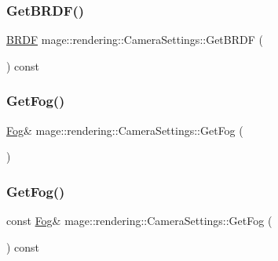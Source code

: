 \hypertarget{classmage_1_1rendering_1_1_camera_settings_a3cb398b3bd69ae3a81e2e4c415d9e195}{}\label{classmage_1_1rendering_1_1_camera_settings_a3cb398b3bd69ae3a81e2e4c415d9e195} 
\subsubsection{\texorpdfstring{Get\+B\+R\+D\+F()}{GetBRDF()}}
{\footnotesize\ttfamily \hyperlink{namespacemage_1_1rendering_ab8fe8684ca4bd74ba3a394b00cf125b5}{B\+R\+DF} mage\+::rendering\+::\+Camera\+Settings\+::\+Get\+B\+R\+DF (\begin{DoxyParamCaption}{ }\end{DoxyParamCaption}) const\hspace{0.3cm}{\ttfamily [noexcept]}}

\hypertarget{classmage_1_1rendering_1_1_camera_settings_a47b2b9eeca9d9eec61a7e290e1abfa43}{}\label{classmage_1_1rendering_1_1_camera_settings_a47b2b9eeca9d9eec61a7e290e1abfa43} 
\subsubsection{\texorpdfstring{Get\+Fog()}{GetFog()}\hspace{0.1cm}{\footnotesize\ttfamily [1/2]}}
{\footnotesize\ttfamily \hyperlink{classmage_1_1rendering_1_1_fog}{Fog}\& mage\+::rendering\+::\+Camera\+Settings\+::\+Get\+Fog (\begin{DoxyParamCaption}{ }\end{DoxyParamCaption})\hspace{0.3cm}{\ttfamily [noexcept]}}

\hypertarget{classmage_1_1rendering_1_1_camera_settings_acd360516b025b09c2ac668f48d6259c7}{}\label{classmage_1_1rendering_1_1_camera_settings_acd360516b025b09c2ac668f48d6259c7} 
\subsubsection{\texorpdfstring{Get\+Fog()}{GetFog()}\hspace{0.1cm}{\footnotesize\ttfamily [2/2]}}
{\footnotesize\ttfamily const \hyperlink{classmage_1_1rendering_1_1_fog}{Fog}\& mage\+::rendering\+::\+Camera\+Settings\+::\+Get\+Fog (\begin{DoxyParamCaption}{ }\end{DoxyParamCaption}) const\hspace{0.3cm}{\ttfamily [noexcept]}}

